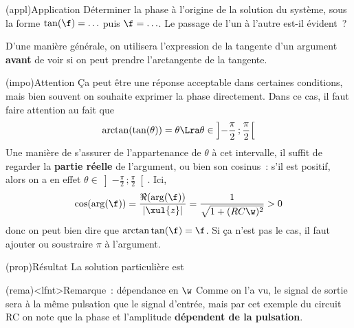 \documentclass[../../main/main.tex]{subfiles}
\begin{document}
\begin{tcb}(appl){Application}
	Déterminer la phase à l'origine de la solution du système, sous la forme
	$\tan(\f) = \ldots$ puis $\f = \ldots$. Le passage de l'un à l'autre est-il
	évident~?
	\tcblower
\end{tcb}
D'une manière générale, on utilisera l'expression de la tangente d'un
argument \textbf{avant} de voir si on peut prendre l'arctangente de la
tangente.
\begin{tcb}(impo){Attention}
	Ça peut être une réponse acceptable dans certaines conditions, mais bien souvent
	on souhaite exprimer la phase directement. Dans ce cas, il faut faire attention
	au fait que
	\[
	\arctan(\tan(\theta)) = \theta
	\Lra
	\theta \in \left] - \frac{\pi}{2}\,; \frac{\pi}{2} \right[
		\]
		Une manière de s'assurer de l'appartenance de $\theta$ à cet intervalle, il
		suffit de regarder la \textbf{partie réelle} de l'argument, ou bien son
		cosinus~: s'il est positif, alors on a en effet $\theta \in \left] -
	\frac{\pi}{2}\,; \frac{\pi}{2} \right[$. Ici,
		\begin{gather*}
			\cos(\arg(\f))
			= \frac{\Re(\arg(\f))}{|\xul{z}|}
			= \frac{1}{\sqrt{1 + (RC\w)^2}} > 0
		\end{gather*}
		donc on peut bien dire que $\arctan\tan(\f) = \f$.
		\smallbreak
		Si ça n'est pas le cas, il faut ajouter ou soustraire $\pi$ à l'argument.
\end{tcb}

\begin{tcb}(prop){Résultat}
	La solution particulière est
\end{tcb}

\begin{tcb}(rema)<lfnt>{Remarque~: dépendance en $\w$}
	Comme on l'a vu, le signal de sortie sera à la même pulsation que le signal
	d'entrée, mais par cet exemple du circuit RC on note que la phase et
	l'amplitude \textbf{dépendent de la pulsation}.
\end{tcb}
\end{document}
